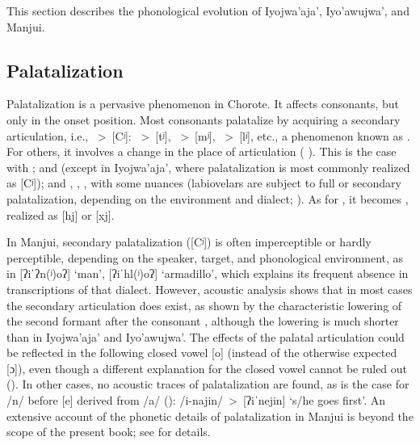 This section describes the phonological evolution of Iyojwa’aja’, Iyo’awujwa’, and Manjui.

\subsection{Palatalization}\label{ch-palat}

Palatalization is a pervasive phenomenon in Chorote. It affects consonants, but only in the onset position. Most consonants palatalize by acquiring a secondary articulation, i.e., ~>~[Cʲ]: ~>~[tʲ], ~>~[mʲ], ~>~[lʲ], etc., a phenomenon known as  \citep{NB07}. For others, it involves a change in the place of articulation ( ). This is the case with ;  and  (except in Iyojwa'aja', where palatalization is most commonly realized as [Cʲ]); and , , , with some nuances (labiovelars are subject to full or secondary palatalization, depending on the environment and dialect; ). As for , it becomes , realized as [hj] or [xj].

In Manjui, secondary palatalization ([Cʲ]) is often imperceptible or hardly perceptible, depending on the speaker, target, and phonological environment, as in [ʔiˈʔn(ʲ)oʔ] `man', [ʔiˈhl(ʲ)oʔ] `armadillo', which explains its frequent absence in  transcriptions of that dialect. However, acoustic analysis shows that in most cases the secondary articulation does exist, as shown by the characteristic lowering of the second formant after the consonant \citep[364]{PLIM96}, although the lowering is much shorter than in Iyojwa'aja' and Iyo'awujwa'. The effects of the palatal articulation could be reflected in the following closed vowel [o] (instead of the otherwise expected [ɔ]), even though a different explanation for the closed vowel cannot be ruled out (). In other cases, no acoustic traces of palatalization are found, as is the case for /n/ before [e] derived from /a/ (): /i\mbox{-}najin/~>~[ʔiˈnejin] `s/he goes first'. An extensive account of the phonetic details of palatalization in Manjui is beyond the scope of the present book; see \citet{JC-amer} for details.

